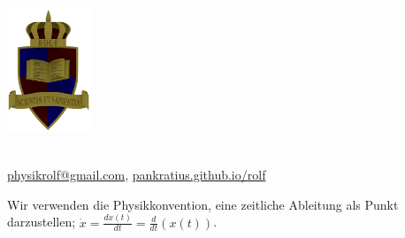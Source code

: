 \documentclass[a4paper]{article}
\begin{document}
	\vspace*{-2cm}
	\parbox{4cm}{\includegraphics[width=2.5cm]{../images/ROLF4.png}}
	\parbox{10.6cm}{ \\ \href{mailto:physikrolf@gmail.com}{physikrolf@gmail.com}, \url{pankratius.github.io/rolf} \\ \vspace*{-.5cm} }
	\begin{framed}
		\small
	Wir verwenden die Physikkonvention, eine zeitliche Ableitung als Punkt darzustellen; $\dot{x} = \frac{dx\left(t\right)}{dt} = \frac{d}{dt}\left(x\left(t\right)\right)$.
	\end{framed}
	

\thispagestyle{empty}


\noindent



\end{document}
